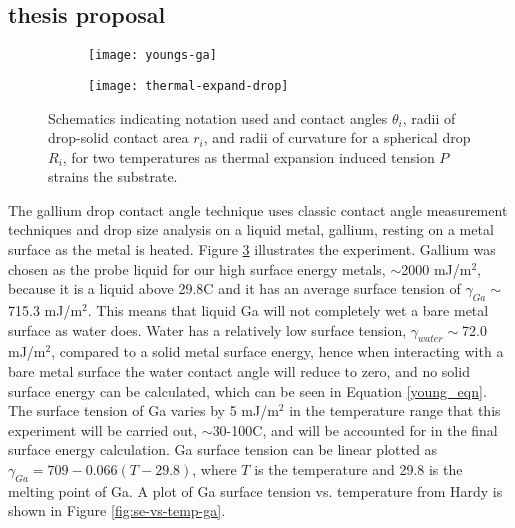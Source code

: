 
\subsection{thesis proposal}

\begin{figure}
	\centering
	\begin{subfigure}[b]{0.7\textwidth}
		\texttt{[image: youngs-ga]}
		\label{fig:youngs-ga}
	\end{subfigure}
	\begin{subfigure}[b]{0.7\textwidth}
		\texttt{[image: thermal-expand-drop]}
		\label{fig:thermal-expand-drop}
	\end{subfigure}
	\caption{Schematics indicating notation used and contact angles $\theta_{i}$, radii of drop-solid contact area $r_{i}$, and radii of curvature for a spherical drop $R_{i}$, for two temperatures as thermal expansion induced tension $P$ strains the substrate.}
	\label{fig:therm-exp-ga}
\end{figure}
The gallium drop contact angle technique uses classic contact angle measurement techniques and drop size analysis on a liquid metal, gallium, resting on a metal surface as the metal is heated. Figure \ref{fig:therm-exp-ga} illustrates the experiment. Gallium was chosen as the probe liquid for our high surface energy metals, \gamSV $\sim$2000 mJ/m$^2$, because it is a liquid above 29.8\degree C and it has an average surface tension of $\gamma_{Ga}\sim$715.3 mJ/m$^2$.\cite{Hardy1985} This means that liquid Ga will not completely wet a bare metal surface as water does. Water has a relatively low surface tension, $\gamma_{water}\sim$72.0 mJ/m$^2$, compared to a solid metal surface energy, hence when interacting with a bare metal surface the water contact angle will reduce to zero, and no solid surface energy can be calculated, which can be seen in Equation \ref{young_eqn}. The surface tension of Ga varies by 5 mJ/m$^2$ in the temperature range that this experiment will be carried out, $\sim$30-100\degree C, and will be accounted for in the final surface energy calculation. Ga surface tension can be linear plotted as $\gamma_{Ga} = 709 - 0.066(T-29.8)$, where $T$ is the temperature and 29.8 is the melting point of Ga.\cite{Hardy1985} A plot of Ga surface tension vs. temperature from Hardy \etal is shown in Figure \ref{fig:se-vs-temp-ga}. 

